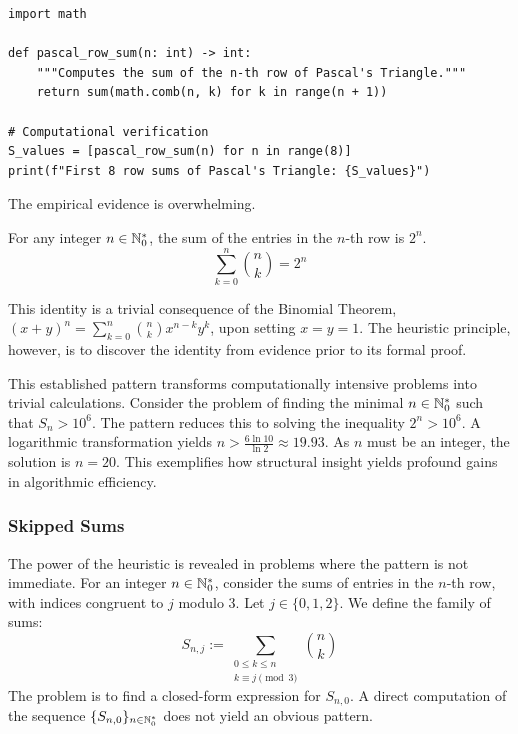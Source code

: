 \begin{verbatim}
import math

def pascal_row_sum(n: int) -> int:
    """Computes the sum of the n-th row of Pascal's Triangle."""
    return sum(math.comb(n, k) for k in range(n + 1))

# Computational verification
S_values = [pascal_row_sum(n) for n in range(8)]
print(f"First 8 row sums of Pascal's Triangle: {S_values}")
\end{verbatim}

The empirical evidence is overwhelming.

\begin{proposition}
For any integer $n \in \mathbb{N}_{0}^*$, the sum of the entries in the $n$-th row is $2^n$.
$$ \sum_{k=0}^{n} \binom{n}{k} = 2^n $$
\end{proposition}
\begin{remark}
This identity is a trivial consequence of the Binomial Theorem, $(x+y)^n = \sum_{k=0}^n \binom{n}{k}x^{n-k}y^k$, upon setting $x=y=1$. The heuristic principle, however, is to discover the identity from evidence prior to its formal proof.
\end{remark}

This established pattern transforms computationally intensive problems into trivial calculations. Consider the problem of finding the minimal $n \in \mathbb{N}_{0}^*$ such that $S_n > 10^6$. The pattern reduces this to solving the inequality $2^n > 10^6$. A logarithmic transformation yields $n > \frac{6 \ln 10}{\ln 2} \approx 19.93$. As $n$ must be an integer, the solution is $n=20$. This exemplifies how structural insight yields profound gains in algorithmic efficiency.

\subsubsection{Skipped Sums}

The power of the heuristic is revealed in problems where the pattern is not immediate. For an integer $n \in \mathbb{N}_{0}^*$, consider the sums of entries in the $n$-th row, with indices congruent to $j$ modulo 3. Let $j \in \{0, 1, 2\}$. We define the family of sums:
$$ S_{n,j} := \sum_{\substack{0 \le k \le n \\ k \equiv j \pmod 3}} \binom{n}{k} $$
The problem is to find a closed-form expression for $S_{n,0}$. A direct computation of the sequence $\{S_{n,0}\}_{n \in \mathbb{N}_{0}^*}$ does not yield an obvious pattern.

